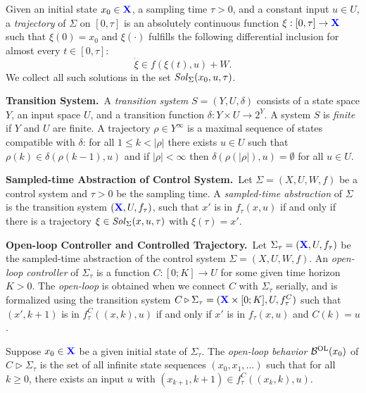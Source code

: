 Given an initial state $x_0\in {\color{blue} \mathbf{X}}$, a sampling time $\tau>0$, and a constant input $u\in U$, 
a \emph{trajectory} of $\Sigma$ 
on $[0,\tau]$ is an absolutely continuous function $\xi:[0,\tau]\rightarrow {\color{blue} \mathbf{X}}$  such that $\xi(0) = x_0$ and
$\xi(\cdot)$ fulfills the following differential inclusion for almost every $t\in[0,\tau]$:
\begin{equation}\label{equ:def_f}
 \dot{\xi}\in f(\xi(t),u) + W. 
\end{equation} 
We collect all such solutions in the set $\mathit{Sol}_\Sigma(x_0,u,\tau)$. 

\smallskip
\noindent\textbf{Transition System.}\
A \emph{transition system} $S=(Y,U,\delta)$ consists of a state space $Y$, an input space $U$, and a transition function $\delta:Y\times U \rightarrow 2^Y$. 
A system $S$ is \emph{finite} if $Y$ and $U$ are finite. 
A trajectory $\rho\in Y^\infty$ is a maximal sequence of states compatible with $\delta$:
for all $1\leq k < |\rho|$ there exists $u\in U$ such that $\rho(k)\in \delta(\rho(k-1),u)$ and 
if $|\rho| < \infty$ then $\delta(\rho(|\rho|),u)= \emptyset$ for all $u\in U$.

\smallskip
\noindent\textbf{Sampled-time Abstraction of Control System.}\
Let $\Sigma = (X, U, W, f)$ be a control system and $\tau>0$ be the sampling time.
A \emph{sampled-time abstraction} of $\Sigma$ is the transition system $({\color{blue} \mathbf{X}},U,f_\tau)$, such that $x'$ is in $f_\tau(x,u)$ if and only if there is a trajectory $\xi\in \mathit{Sol}_\Sigma(x,u,\tau)$ with $\xi(\tau)=x'$.

\smallskip
\noindent\textbf{Open-loop Controller and Controlled Trajectory.}\
Let $\Sigma_\tau=({\color{blue} \mathbf{X}},U,f_\tau)$ be the sampled-time abstraction of the control system $\Sigma=(X,U,W,f)$.
An \emph{open-loop controller} of $\Sigma_\tau$ is a function $C:[0;K]\rightarrow U$ for some given time horizon $K>0$.
The \emph{open-loop} is obtained when we connect $C$ with $\Sigma_\tau$ serially, and is formalized using the transition system $C \triangleright \Sigma_\tau = ({\color{blue} \mathbf{X}}\times [0;K],U,f_\tau^C)$ such that $(x',k+1)$ is in $f_\tau^C((x,k),u)$ if and only if $x'$ is in $f_\tau(x,u)$ and $C(k)=u$.

Suppose $x_0\in {\color{blue} \mathbf{X}}$ be a given initial state of $\Sigma_\tau$.
The \emph{open-loop behavior} $\mathcal{B}^{\mathrm{OL}}(x_0)$ of $C \triangleright\Sigma_\tau$ is the set of all infinite state sequences $(x_0,x_1,\ldots)$ such that for all $k\geq 0$, there exists an input $u$ with $(x_{k+1},k+1)\in f_\tau^C((x_k,k),u)$.

